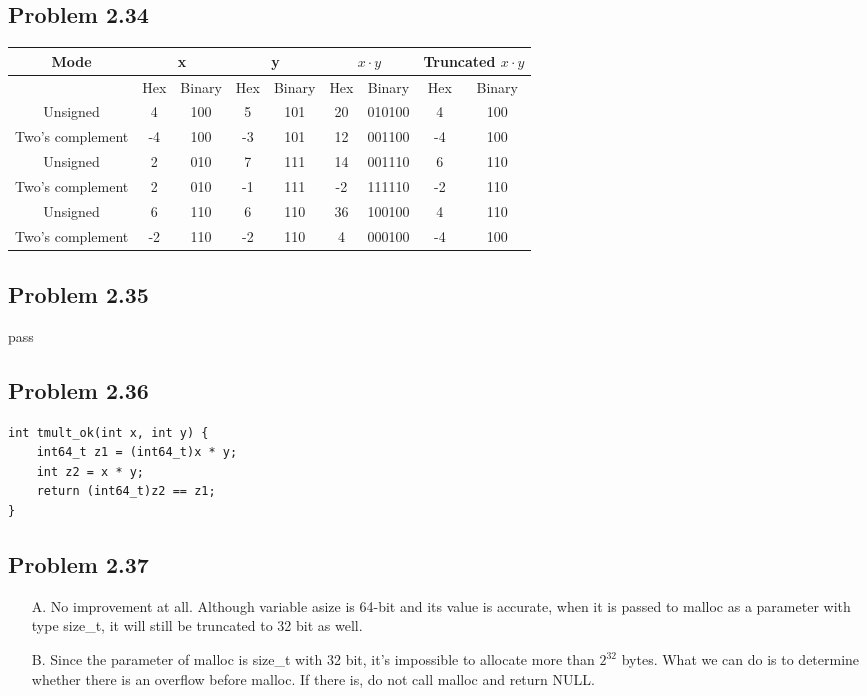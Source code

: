 \documentclass[a4paper]{article}
\begin{document}
\subsection*{Problem 2.34}
\begin{tabular}{c|cc|cc|cc|cc}
    Mode&\multicolumn{2}{|c|}{x}&\multicolumn{2}{|c|}{y}&\multicolumn{2}{|c|}{$x\cdot y$}&\multicolumn{2}{c}{Truncated $x\cdot y$}\\
    \hline
    {}&Hex&Binary&Hex&Binary&Hex&Binary&Hex&Binary\\
    \hline
    Unsigned&4&100&5&101&20&010100&4&100\\
    Two's complement&-4&100&-3&101&12&001100&-4&100\\
    \hline
    Unsigned&2&010&7&111&14&001110&6&110\\
    Two's complement&2&010&-1&111&-2&111110&-2&110\\
    \hline
    Unsigned&6&110&6&110&36&100100&4&110\\
    Two's complement&-2&110&-2&110&4&000100&-4&100
\end{tabular}

\subsection*{Problem 2.35}
pass

\subsection*{Problem 2.36}
\begin{lstlisting}
int tmult_ok(int x, int y) {
    int64_t z1 = (int64_t)x * y;
    int z2 = x * y;
    return (int64_t)z2 == z1;
}
\end{lstlisting}

\subsection*{Problem 2.37}
\begin{enumerate}
    \item [A.] No improvement at all. Although variable asize is 64-bit and its value is accurate, when it is passed to malloc as a parameter with type size\_t, it will still be truncated to 32 bit as well.
    \item [B.] Since the parameter of malloc is size\_t with 32 bit, it's impossible to allocate more than $2^{32}$ bytes. What we can do is to determine whether there is an overflow before malloc. If there is, do not call malloc and return NULL.
\end{enumerate}
\end{document}
